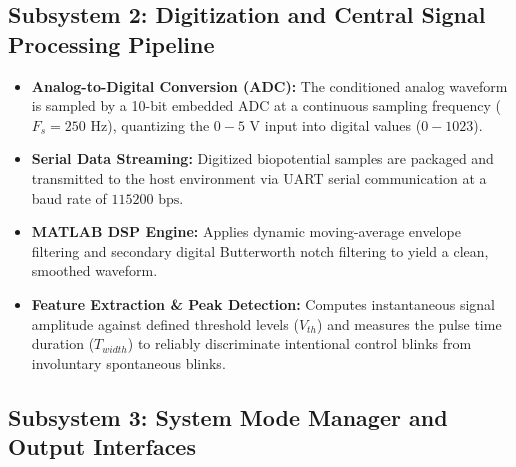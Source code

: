 \subsection{Subsystem 2: Digitization and Central Signal Processing Pipeline}
\label{subsec:subsystem2_dsp}
\label{subsec:sampling_quantization}
\label{subsec:serial_telemetry}
\label{subsec:serial_data_streaming}
\label{subsec:digital_signal_filtering}
\label{subsec:feature_extraction_classification}

\begin{itemize}
    \item \textbf{Analog-to-Digital Conversion (ADC):} The conditioned analog waveform is sampled by a 10-bit embedded ADC at a continuous sampling frequency ($F_s = 250\text{ Hz}$), quantizing the $0-5\text{ V}$ input into digital values ($0-1023$).
    \item \textbf{Serial Data Streaming:} Digitized biopotential samples are packaged and transmitted to the host environment via UART serial communication at a baud rate of $115200\text{ bps}$.
    \item \textbf{MATLAB DSP Engine:} Applies dynamic moving-average envelope filtering and secondary digital Butterworth notch filtering to yield a clean, smoothed waveform.
    \item \textbf{Feature Extraction \& Peak Detection:} Computes instantaneous signal amplitude against defined threshold levels ($V_{th}$) and measures the pulse time duration ($T_{width}$) to reliably discriminate intentional control blinks from involuntary spontaneous blinks.
\end{itemize}

\subsection{Subsystem 3: System Mode Manager and Output Interfaces}
\label{subsec:subsystem3_mode_manager}
\label{subsec:fsm_decision_engine}
\label{subsec:system_mode_management}
\label{subsec:virtual_keyboard_gui}

